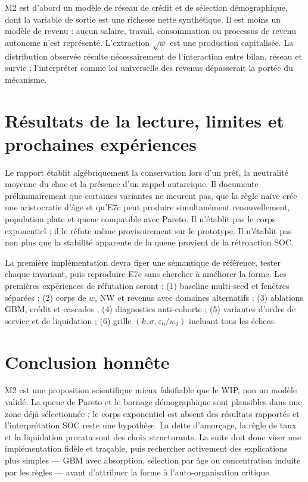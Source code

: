\documentclass[11pt,a4paper]{article}
\newcommand{\NW}{\mathrm{NW}}
\begin{document}
M2 est d'abord un modèle de réseau de crédit et de sélection démographique, dont
la variable de sortie est une richesse nette synthétique. Il est moins un modèle
de revenu : aucun salaire, travail, consommation ou processus de revenu autonome
n'est représenté. L'extraction $\sqrt w$ est une production capitalisée. La
distribution observée résulte nécessairement de l'interaction entre bilan,
réseau et survie ; l'interpréter comme loi universelle des revenus dépasserait
la portée du mécanisme.

\section{Résultats de la lecture, limites et prochaines expériences}

Le rapport établit algébriquement la conservation lors d'un prêt, la neutralité
moyenne du choc et la présence d'un rappel autarcique. Il documente
préliminairement que certaines variantes ne meurent pas, que la règle naïve crée
une aristocratie d'âge et qu'E7c peut produire simultanément renouvellement,
population plate et queue compatible avec Pareto. Il n'établit pas le corps
exponentiel ; il le réfute même provisoirement sur le prototype. Il n'établit pas
non plus que la stabilité apparente de la queue provient de la rétroaction SOC.

La première implémentation devra figer une sémantique de référence, tester chaque
invariant, puis reproduire E7c sans chercher à améliorer la forme. Les premières
expériences de réfutation seront : (1) baseline multi-seed et fenêtres séparées ;
(2) corps de $w$, $\NW$ et revenus avec domaines alternatifs ; (3) ablations GBM,
crédit et cascades ; (4) diagnostics anti-cohorte ; (5) variantes d'ordre de
service et de liquidation ; (6) grille $(k,\sigma,\varepsilon_0/w_0)$ incluant
tous les échecs.

\section{Conclusion honnête}

M2 est une proposition scientifique mieux falsifiable que le WIP, non un modèle
validé. La queue de Pareto et le bornage démographique sont plausibles dans une
zone déjà sélectionnée ; le corps exponentiel est absent des résultats rapportés
et l'interprétation SOC reste une hypothèse. La dette d'amorçage, la règle de taux
et la liquidation prorata sont des choix structurants. La suite doit donc viser
une implémentation fidèle et traçable, puis rechercher activement des explications
plus simples --- GBM avec absorption, sélection par âge ou concentration induite
par les règles --- avant d'attribuer la forme à l'auto-organisation critique.
\end{document}
